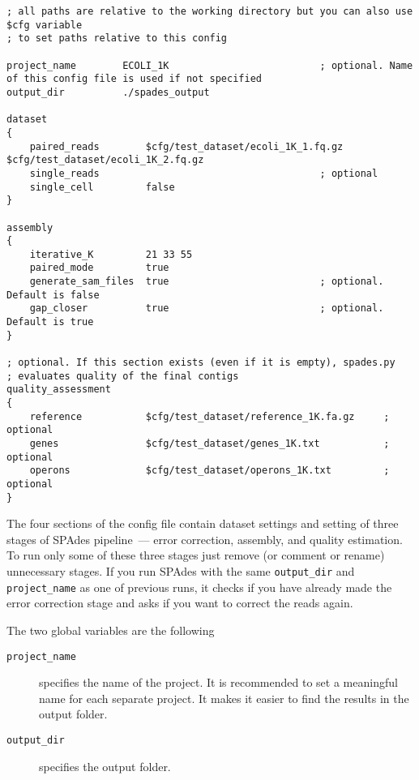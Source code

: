 \documentclass{article}
\def\spades{SPAdes}
\begin{document}

\begin{lstlisting}													
; all paths are relative to the working directory but you can also use $cfg variable 
; to set paths relative to this config

project_name        ECOLI_1K                          ; optional. Name of this config file is used if not specified
output_dir          ./spades_output

dataset
{
    paired_reads        $cfg/test_dataset/ecoli_1K_1.fq.gz $cfg/test_dataset/ecoli_1K_2.fq.gz
    single_reads                                      ; optional
    single_cell         false
}

assembly
{
    iterative_K         21 33 55
    paired_mode         true
    generate_sam_files  true                          ; optional. Default is false
    gap_closer          true                          ; optional. Default is true
}

; optional. If this section exists (even if it is empty), spades.py 
; evaluates quality of the final contigs
quality_assessment      
{
    reference           $cfg/test_dataset/reference_1K.fa.gz     ; optional
    genes               $cfg/test_dataset/genes_1K.txt           ; optional
    operons             $cfg/test_dataset/operons_1K.txt         ; optional
}
\end{lstlisting}

The four sections of the config file contain dataset settings
and setting of three stages of {\spades} pipeline~--- error correction,
assembly, and quality estimation.
To run only some of these three stages just remove (or comment or rename) unnecessary stages.
If you run {\spades} with the same {\tt output\_dir} and {\tt project\_name} as one of previous runs, it checks if you have already made the error correction stage and asks if you want to correct the reads again.

The two global variables are the following
\begin{description}
\item[{\tt project\_name}] specifies the name of the project. It is recommended to set a meaningful name for each separate project.
It makes it easier to find the results in the output folder.
\item[{\tt output\_dir}] specifies the output folder.
\end{description}
\end{document}
